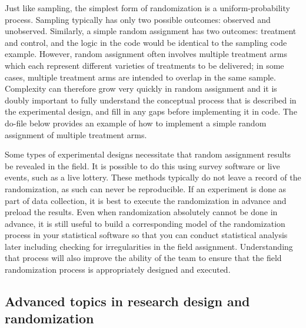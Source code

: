 Just like sampling, the simplest form of randomization
is a uniform-probability process.
Sampling typically has only two possible outcomes: observed and unobserved.
Similarly, a simple random assignment has two outcomes: treatment and control,
and the logic in the code would be identical to the sampling code example.
However, random assignment often involves multiple treatment arms
which each represent different varieties of treatments to be delivered;
in some cases, multiple treatment arms are intended to overlap in the same sample.
Complexity can therefore grow very quickly in random assignment
and it is doubly important to fully understand the conceptual process
that is described in the experimental design,
and fill in any gaps before implementing it in code.
The do-file below provides an example of how to implement
a simple random assignment of multiple treatment arms.


Some types of experimental designs necessitate
that random assignment results be revealed in the field.
It is possible to do this using survey software or live events, such as a live lottery.
These methods typically do not leave a record of the randomization,
as such can never be reproducible. If an experiment is done as part of data collection,
it is best to execute the randomization in advance and preload the results.
Even when randomization absolutely cannot be done in advance, it is still useful
to build a corresponding model of the randomization process in your statistical software
so that you can conduct statistical analysis later
including checking for irregularities in the field assignment.
Understanding that process will also improve the ability of the team
to ensure that the field randomization process is appropriately designed and executed.



\subsection{Advanced topics in research design and randomization}

